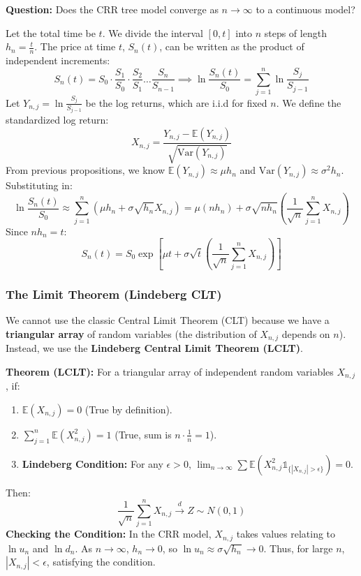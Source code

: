\textbf{Question:} Does the CRR tree model converge as \(n \to \infty\) to a continuous model?

Let the total time be \(t\). We divide the interval \([0, t]\) into \(n\) steps of length \(h_n = \frac{t}{n}\).
The price at time \(t\), \(S_n(t)\), can be written as the product of independent increments:
\begin{equation*}
    S_n(t) = S_0 \cdot \frac{S_1}{S_0} \cdot \frac{S_2}{S_1} \dots \frac{S_n}{S_{n-1}} \implies     \ln \frac{S_n(t)}{S_0} = \sum_{j=1}^{n} \ln \frac{S_j}{S_{j-1}}
\end{equation*}
Let \(Y_{n,j} = \ln \frac{S_j}{S_{j-1}}\) be the log returns, which are i.i.d for fixed \(n\).
We define the standardized log return:
\begin{equation*}
    X_{n,j} = \frac{Y_{n,j} - \mathbb{E}(Y_{n,j})}{\sqrt{\text{Var}(Y_{n,j})}}
\end{equation*}
From previous propositions, we know \(\mathbb{E}(Y_{n,j}) \approx \mu h_n\) and \(\text{Var}(Y_{n,j}) \approx \sigma^2 h_n\).
Substituting in:
\begin{equation*}
    \ln \frac{S_n(t)}{S_0} \approx \sum_{j=1}^{n} (\mu h_n + \sigma\sqrt{h_n} X_{n,j}) = \mu (n h_n) + \sigma\sqrt{n h_n} \left( \frac{1}{\sqrt{n}} \sum_{j=1}^{n} X_{n,j} \right)
\end{equation*}
Since \(n h_n = t\):
\begin{equation*}
    S_n(t) = S_0 \exp \left[ \mu t + \sigma\sqrt{t} \left( \frac{1}{\sqrt{n}} \sum_{j=1}^{n} X_{n,j} \right) \right]
\end{equation*}

\subsubsection{The Limit Theorem (Lindeberg CLT)}
We cannot use the classic Central Limit Theorem (CLT) because we have a \textbf{triangular array} of random variables (the distribution of \(X_{n,j}\) depends on \(n\)).
Instead, we use the \textbf{Lindeberg Central Limit Theorem (LCLT)}.

\textbf{Theorem (LCLT):} For a triangular array of independent random variables \(X_{n,j}\), if:
\begin{enumerate}
    \item \(\mathbb{E}(X_{n,j}) = 0\) (True by definition).
    \item \(\sum_{j=1}^{n} \mathbb{E}(X_{n,j}^2) = 1\) (True, sum is \(n \cdot \frac{1}{n} = 1\)).
    \item \textbf{Lindeberg Condition:} For any \(\epsilon > 0\), \(\lim_{n \to \infty} \sum \mathbb{E}(X_{n,j}^2 \mathbb{1}_{\{|X_{n,j}| > \epsilon\}}) = 0\).
\end{enumerate}
Then:
\begin{equation*}
    \frac{1}{\sqrt{n}} \sum_{j=1}^{n} X_{n,j} \xrightarrow{d} Z \sim N(0,1)
\end{equation*}
\noindent \textbf{Checking the Condition:}
In the CRR model, \(X_{n,j}\) takes values relating to \(\ln u_n\) and \(\ln d_n\). As \(n \to \infty\), \(h_n \to 0\), so \(\ln u_n \approx \sigma\sqrt{h_n} \to 0\). Thus, for large \(n\), \(|X_{n,j}| < \epsilon\), satisfying the condition.

